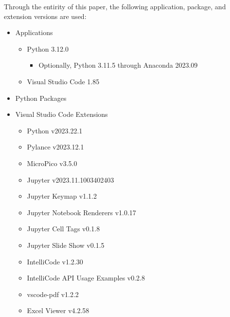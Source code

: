 Through the entirity of this paper, the following application, package, and extension versions are used:

\begin{itemize}
    \item Applications
    \begin{itemize}
        \item Python 3.12.0
            \begin{itemize}
                \item Optionally, Python 3.11.5 through Anaconda 2023.09
            \end{itemize}
        \item Visual Studio Code 1.85
    \end{itemize}
    \item Python Packages
    \item Visual Studio Code Extensions
    \begin{itemize}
        \item Python v2023.22.1
        \item Pylance v2023.12.1
        \item MicroPico v3.5.0
        \item Jupyter v2023.11.1003402403
        \item Jupyter Keymap v1.1.2
        \item Jupyter Notebook Renderers v1.0.17 
        \item Jupyter Cell Tags v0.1.8
        \item Jupyter Slide Show v0.1.5
        \item IntelliCode v1.2.30
        \item IntelliCode API Usage Examples v0.2.8
        \item vscode-pdf v1.2.2
        \item Excel Viewer v4.2.58
    \end{itemize}
\end{itemize}
